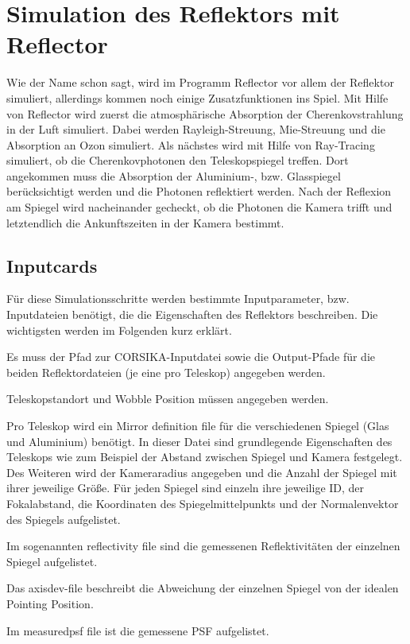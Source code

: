 \section{Simulation des Reflektors mit Reflector}
Wie der Name schon sagt, wird im Programm Reflector vor allem der Reflektor simuliert, allerdings kommen noch einige Zusatzfunktionen ins Spiel.\newline
Mit Hilfe von Reflector wird zuerst die atmosphärische Absorption der Cherenkovstrahlung in der Luft simuliert. 
Dabei werden Rayleigh-Streuung, Mie-Streuung und die Absorption an Ozon simuliert.
Als nächstes wird mit Hilfe von Ray-Tracing simuliert, ob die Cherenkovphotonen den Teleskopspiegel treffen.
Dort angekommen muss die Absorption der Aluminium-, bzw. Glasspiegel berücksichtigt werden und die Photonen reflektiert werden.
Nach der Reflexion am Spiegel wird nacheinander gecheckt, ob die Photonen die Kamera trifft und letztendlich die Ankunftszeiten in der Kamera bestimmt.

\subsection{Inputcards}
Für diese Simulationsschritte werden bestimmte Inputparameter, bzw. Inputdateien benötigt, die die Eigenschaften des Reflektors beschreiben.
Die wichtigsten werden im Folgenden kurz erklärt.

Es muss der Pfad zur CORSIKA-Inputdatei sowie die Output-Pfade für die beiden Reflektordateien (je eine pro Teleskop) angegeben werden.

Teleskopstandort und Wobble Position müssen angegeben werden.

Pro Teleskop wird ein Mirror definition file für die verschiedenen Spiegel (Glas und Aluminium) benötigt.
In dieser Datei sind grundlegende Eigenschaften des Teleskops wie zum Beispiel der Abstand zwischen Spiegel und Kamera festgelegt. 
Des Weiteren wird der Kameraradius angegeben und die Anzahl der Spiegel mit ihrer jeweilige Größe.
Für jeden Spiegel sind einzeln ihre jeweilige ID, der Fokalabstand, die Koordinaten des Spiegelmittelpunkts und der Normalenvektor des Spiegels aufgelistet.

Im sogenannten reflectivity file sind die gemessenen Reflektivitäten der einzelnen Spiegel aufgelistet.

Das axisdev-file beschreibt die Abweichung der einzelnen Spiegel von der idealen Pointing Position.

Im measuredpsf file ist die gemessene PSF aufgelistet.

